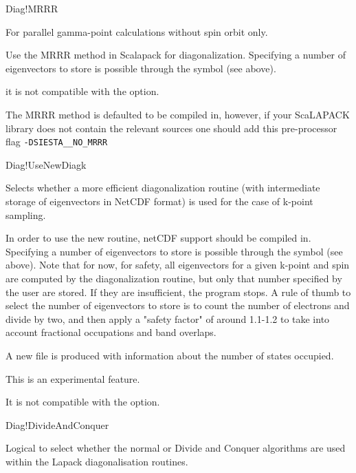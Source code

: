 \begin{fdflogicalF}{Diag!MRRR}

  For parallel gamma-point calculations without spin orbit only.

  Use the MRRR method in Scalapack for diagonalization. Specifying a
  number of eigenvectors to store is possible through the symbol
   (see above).

  \note it is not compatible with the 
  option.

  \note The MRRR method is defaulted to be compiled in, however, if
  your ScaLAPACK library does not contain the relevant sources one
  should add this pre-processor flag \texttt{-DSIESTA\_\_NO\_MRRR}
\end{fdflogicalF}


\begin{fdflogicalF}{Diag!UseNewDiagk}

  Selects whether a more efficient diagonalization routine (with
  intermediate storage of eigenvectors in NetCDF format) is used for
  the case of k-point sampling.

  In order to use the new routine, netCDF support should be compiled
  in.  Specifying a number of eigenvectors to store is possible
  through the symbol  (see above). Note that for
  now, for safety, all eigenvectors for a given k-point and spin are
  computed by the diagonalization routine, but only that number
  specified by the user are stored. If they are insufficient, the
  program stops.  A rule of thumb to select the number of eigenvectors
  to store is to count the number of electrons and divide by two, and
  then apply a "safety factor" of around 1.1-1.2 to take into account
  fractional occupations and band overlaps.

  A new file  is produced with information about the number
  of states occupied.

  This is an experimental feature. 

  \note It is not compatible with the 
  option.

\end{fdflogicalF}


\begin{fdflogicalT}{Diag!DivideAndConquer}

  Logical to select whether the normal or Divide and Conquer
  algorithms are used within the Lapack diagonalisation routines.

\end{fdflogicalT}

